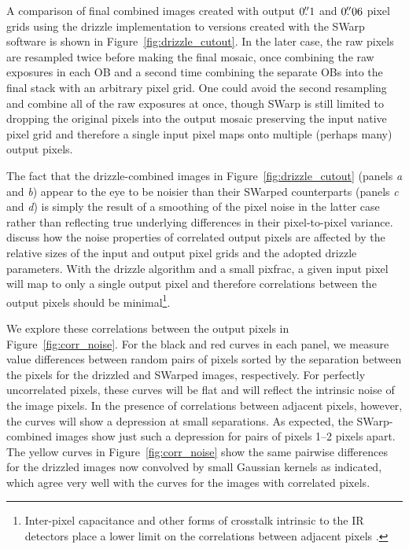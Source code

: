 \documentclass[preprint2]{aastex6}
\begin{document}
A comparison of final combined images created with output $0\mbox{$.\!\!^{\prime\prime}$}1$ and $0\mbox{$.\!\!^{\prime\prime}$}06$ pixel grids using the drizzle implementation to versions created with the SWarp software \citep{swarp} is shown in Figure~\ref{fig:drizzle_cutout}.  In the later case, the raw pixels are resampled twice before making the final mosaic, once combining the raw exposures in each OB and a second time combining the separate OBs into the final stack with an arbitrary pixel grid.  One could avoid the second resampling and combine all of the raw exposures at once, though SWarp is still limited to dropping the original pixels into the output mosaic preserving the input native pixel grid and therefore a single input pixel maps onto multiple (perhaps many) output pixels.

The fact that the drizzle-combined images in Figure~\ref{fig:drizzle_cutout} (panels \textit{a} and \textit{b}) appear to the eye to be noisier than their SWarped counterparts (panels \textit{c} and \textit{d}) is simply the result of a smoothing of the pixel noise in the latter case rather than reflecting true underlying differences in their pixel-to-pixel variance.  \cite{casertano:00} discuss how the noise properties of correlated output pixels are affected by the relative sizes of the input and output pixel grids and the adopted drizzle parameters.  With the drizzle algorithm and a small pixfrac, a given input pixel will map to only a single output pixel and therefore correlations between the output pixels should be minimal\footnote{Inter-pixel capacitance and other forms of crosstalk intrinsic to the IR detectors place a lower limit on the correlations between adjacent pixels \citep{finger:05, hilbert:ipc}.}.  

We explore these correlations between the output pixels in Figure~\ref{fig:corr_noise}.  For the black and red curves in each panel, we measure value differences between random pairs of pixels sorted by the separation between the pixels for the drizzled and SWarped images, respectively.  For perfectly uncorrelated pixels, these curves will be flat and will reflect the intrinsic noise of the image pixels.  In the presence of correlations between adjacent pixels, however, the curves will show a depression at small separations.  As expected, the SWarp-combined images show just such a depression for pairs of pixels 1--2 pixels apart.  The yellow curves in Figure~\ref{fig:corr_noise} show the same pairwise differences for the drizzled images now convolved by small Gaussian kernels as indicated, which agree very well with the curves for the images with correlated pixels.  
\end{document}
